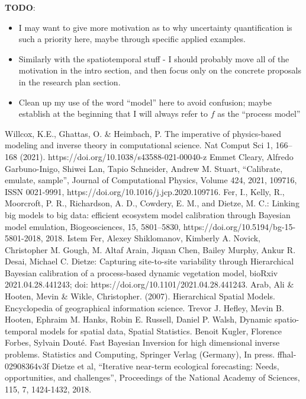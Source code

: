 \documentclass[12pt]{article}
\begin{document}
 
 

 
 \textbf{TODO}:
 \begin{itemize}
 \item I may want to give more motivation as to why uncertainty quantification is such a priority here, maybe through specific applied examples. 
 \item Similarly with the spatiotemporal stuff - I should probably move all of the motivation in the intro section, and then focus only on the concrete proposals in the research plan section. 
 \item Clean up my use of the word ``model'' here to avoid confusion; maybe establish at the beginning that I will always refer to $f$ as the ``process model''
 \end{itemize}


\begin{thebibliography}{20}
 Willcox, K.E., Ghattas, O. \& Heimbach, P. The imperative of physics-based modeling and inverse theory in computational science. Nat Comput Sci 1, 166–168 (2021). https://doi.org/10.1038/s43588-021-00040-z
 Emmet Cleary, Alfredo Garbuno-Inigo, Shiwei Lan, Tapio Schneider, Andrew M. Stuart, “Calibrate, emulate, sample”, Journal of Computational Physics, Volume 424, 2021, 109716, ISSN 0021-9991, https://doi.org/10.1016/j.jcp.2020.109716.
 Fer, I., Kelly, R., Moorcroft, P. R., Richardson, A. D., Cowdery, E. M., and Dietze, M. C.: Linking big models to big data: efficient ecosystem model calibration through Bayesian model emulation, Biogeosciences, 15, 5801–5830, https://doi.org/10.5194/bg-15-5801-2018, 2018.
 Istem Fer, Alexey Shiklomanov, Kimberly A. Novick, Christopher M. Gough, M. Altaf Arain, Jiquan Chen, Bailey Murphy, Ankur R. Desai, Michael C. Dietze: Capturing site-to-site variability through Hierarchical Bayesian calibration of a process-based dynamic vegetation model, bioRxiv 2021.04.28.441243; doi: https://doi.org/10.1101/2021.04.28.441243. 
 Arab, Ali \& Hooten, Mevin \& Wikle, Christopher. (2007). Hierarchical Spatial Models. Encyclopedia of geographical information science.
 Trevor J. Hefley, Mevin B. Hooten, Ephraim M. Hanks, Robin E. Russell, Daniel P. Walsh, Dynamic spatio-temporal models for spatial data, Spatial Statistics.
 Benoit Kugler, Florence Forbes, Sylvain Douté. Fast Bayesian Inversion for high dimensional inverse problems. Statistics and Computing, Springer Verlag (Germany), In press. ffhal-02908364v3f
 Dietze et al, “Iterative near-term ecological forecasting: Needs, opportunities, and challenges”, Proceedings of the National Academy of Sciences, 115, 7, 1424-1432, 2018.

\end{thebibliography}
\end{document}
